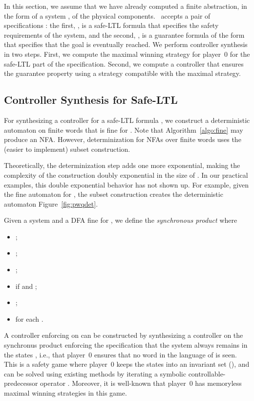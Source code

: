 In this section, we assume that we have already computed a finite
abstraction, 
in the form of a system , of the physical components.
\tool~accepts a pair of specifications : the
first, , is a safe-LTL
formula that specifies the safety requirements of the system, and
the second, , is a guarantee formula of the form  that
specifies that the goal  is eventually reached.
We perform controller synthesis in two steps.
First, we compute the maximal winning strategy for player~0 for the
safe-LTL part of the specification.
Second, we compute a controller that ensures the guarantee property
using a strategy compatible with the maximal strategy.

\subsection{Controller Synthesis for Safe-LTL}

For synthesizing a controller for a safe-LTL formula , we construct a
deterministic automaton on finite words that is fine for .
Note that Algorithm~\ref{algo:fine} may produce an NFA.
However, determinization for NFAs over finite words uses the (easier
to implement) subset construction.



Theoretically, the determinization step adds one more exponential,
making the complexity of the construction doubly exponential in the
size of .
In our practical examples, this double exponential behavior has not
shown up.
For example, given the fine automaton for , the subset construction
creates the deterministic automaton Figure~\ref{fig:pwqdet}.

Given a system  and a DFA  fine for , we
define the \emph{synchronous product}  where
\begin{itemize}
 \item ;
 \item ;
\item  ;
\item   if  and ;
\item ;
\item   for each .
\end{itemize}
A controller enforcing  on  can be constructed by synthesizing a controller
on the synchronus product  enforcing the
specification that the system always remains in the states 
, i.e., that player~0 ensures that no word in the
language of  is seen.
This is a safety game where player~0 keeps the states into an
invariant set (), and can be solved using
existing methods by iterating a symbolic controllable-predecessor operator
\cite{Zielonka98,MazoDT10}.
Moreover, it is well-known that player~0 has memoryless maximal
winning strategies in this game.




